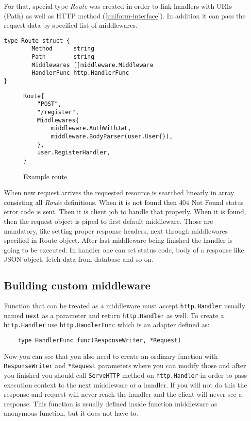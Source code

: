 For that, special type \textit{Route} was created in order to link handlers with URIs (Path) as well as HTTP method (\ref{uniform-interface}). In addition it can pass the request data by specified list of middlewares.

\begin{verbatim}
type Route struct {
        Method      string
        Path        string
        Middlewares []middleware.Middleware
        HandlerFunc http.HandlerFunc
}
\end{verbatim}

\begin{figure}[!htbp]
\begin{verbatim}
Route{
    "POST",
    "/register",
    Middlewares{
        middleware.AuthWithJwt,
        middleware.BodyParser(user.User{}),
    },
    user.RegisterHandler,
}
\end{verbatim}
\caption{Example route}
\label{src:example-route}
\end{figure}

When new request arrives the requested resource is searched linearly in array consisting all \textit{Route} definitions. When it is not found then 404 Not Found status error code is sent. Then it is client job to handle that properly. When it is found, then the request object is piped to first default middleware. Those are mandatory, like setting proper response headers, next through middlewares specified in Route object. After last middleware being finished the handler is going to be executed. In handler one can set status code, body of a response like JSON object, fetch data from database and so on.

\subsection{Building custom middleware}
Function that can be treated as a middleware must accept \verb|http.Handler| usually named \verb|next| as a parameter and return \verb|http.Handler| as well. To create a \verb|http.Handler| use \verb|http.HandlerFunc| which is an adapter\cite{HTTP-go} defined as:
\begin{verbatim}
    type HandlerFunc func(ResponseWriter, *Request)
\end{verbatim}

Now you can see that you also need to create an ordinary function with\\ \verb|ResponseWriter| and \verb|*Request| parameters where you can modify those and after you finished you should call \verb|ServeHTTP| method on \verb|http.Handler| in order to pass execution context to the next middleware or a handler. If you will not do this the response and request will never reach the handler and the client will never see a response. This function is usually defined inside function middleware as anonymous function, but it does not have to.

